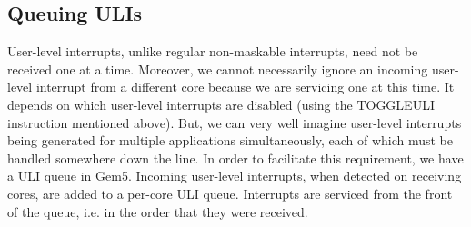 \subsection{Queuing ULIs}\label{sec:uli_queue}
User-level interrupts, unlike regular non-maskable interrupts, need not be
received one at a time. Moreover, we cannot necessarily ignore an incoming
user-level interrupt from a different core because we are servicing one at this
time. It depends on which user-level interrupts are disabled (using the
TOGGLEULI instruction mentioned above). But, we can very well imagine
user-level interrupts being generated for multiple applications simultaneously,
each of which must be handled somewhere down the line. In order to facilitate
this requirement, we have a ULI queue in Gem5. Incoming user-level interrupts,
when detected on receiving cores, are added to a per-core ULI queue. Interrupts
are serviced from the front of the queue, i.e. in the order that they were
received.

